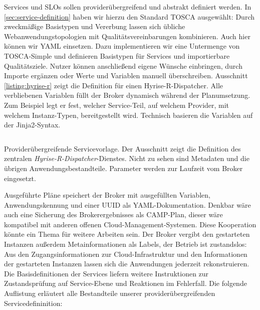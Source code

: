 Services und SLOs sollen providerübergreifend und abstrakt definiert werden. In \autoref{sec:service-definition} haben wir hierzu den Standard TOSCA ausgewählt: Durch zweckmäßige Basistypen und Vererbung lassen sich übliche Webanwendungstopologien mit Qualitätsvereinbarungen kombinieren. Auch hier können wir YAML einsetzen. Dazu implementieren wir eine Untermenge von TOSCA-Simple und definieren Basistypen für Services und importierbare Qualitätsziele. Nutzer können anschließend eigene Wünsche einbringen, durch Importe ergänzen oder Werte und Variablen manuell überschreiben. Ausschnitt \ref{listing:hyrise-r} zeigt die Definition für einen Hyrise-R-Dispatcher. Alle verbliebenen Variablen füllt der Broker dynamisch während der Planumsetzung. Zum Beispiel legt er fest, welcher Service-Teil, auf welchem Provider, mit welchem Instanz-Typen, bereitgestellt wird. Technisch basieren die Variablen auf der Jinja2-Syntax.

\begin{listing}[!ht]	
	\inputminted[firstline=15]{yaml}{./src/hyrise-r.sample.yaml}
	\caption{Providerübergreifende Servicevorlage. Der Ausschnitt zeigt die Definition des zentralen \emph{Hyrise-R-Dispatcher}-Dienstes. Nicht zu sehen sind Metadaten und die übrigen Anwendungsbestandteile. Parameter werden zur Laufzeit vom Broker eingesetzt.}
	\label{listing:hyrise-r}
\end{listing}

Ausgeführte Pläne speichert der Broker mit ausgefüllten Variablen, Anwendungskennung und einer UUID als YAML-Dokumentation. Denkbar wäre auch eine Sicherung des Brokerergebnisses als CAMP-Plan, dieser wäre kompatibel mit anderen offenen Cloud-Management-Systemen. Diese Kooperation könnte ein Thema für weitere Arbeiten sein. Der Broker vergibt den gestarteten Instanzen außerdem Metainformationen als Labels, der Betrieb ist zustandslos: Aus den Zugangsinformationen zur Cloud-Infrastruktur und den Informationen der gestarteten Instanzen lassen sich die Anwendungen jederzeit rekonstruieren. Die Basisdefinitionen der Services liefern weitere Instruktionen zur Zustandsprüfung auf Service-Ebene und Reaktionen im Fehlerfall. Die folgende Auflistung erläutert alle Bestandteile unserer providerübergreifenden Servicedefininition:

